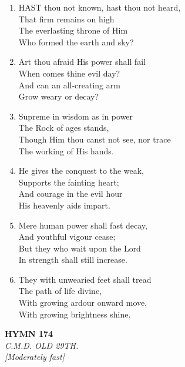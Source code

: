 \begin{enumerate}
    \item HAST thou not known, hast thou not heard, \\
        That firm remains on high \\
        The everlasting throne of Him \\
        Who formed the earth and sky?

    \item Art thou afraid His power shall fail \\
        When comes thine evil day? \\
        And can an all-creating arm \\
        Grow weary or decay?

    \item Supreme in wisdom as in power \\
        The Rock of ages stands, \\
        Though Him thou canst not see, nor trace \\
        The working of His hands.

    \item He gives the conquest to the weak, \\
        Supports the fainting heart; \\
        And courage in the evil hour \\
        His heavenly aids impart.

    \item Mere human power shall fast decay, \\
        And youthful vigour cease; \\
        But they who wait upon the Lord \\
        In strength shall still increase.

    \item They with unwearied feet shall tread \\
        The path of life divine, \\
        With growing ardour onward move, \\
        With growing brightness shine.

\end{enumerate}

\newpage
\begin{center}
    {\Large \textbf{HYMN 174}}
    \\
    \textit{C.M.D. OLD 29TH.}
    \\
    \textit{\small [Moderately fast]}
\end{center}
\vspace{1em}

